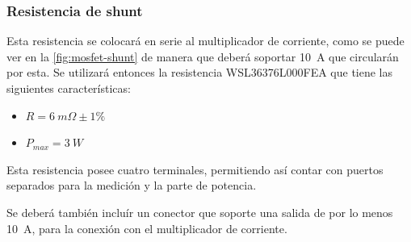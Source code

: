 \documentclass[../et.tex]{subfiles}
\begin{document}
  \subsubsection{Resistencia de shunt}
  Esta resistencia se colocará en serie al multiplicador de corriente, como se puede ver en la \autoref{fig:mosfet-shunt} de manera que deberá soportar \SI{10}{A} que circularán por esta. Se utilizará entonces la resistencia WSL36376L000FEA que tiene las siguientes características:

  \begin{itemize}
    \item $R = \SI{6}{m\Omega} \pm 1\%$
    \item $P_{max} = \SI{3}{W}$
  \end{itemize}

  Esta resistencia posee cuatro terminales, permitiendo así contar con puertos separados para la medición y la parte de potencia.

  Se deberá también incluír un conector que soporte una salida de por lo menos \SI{10}{A}, para la conexión con el multiplicador de corriente.
\end{document}
